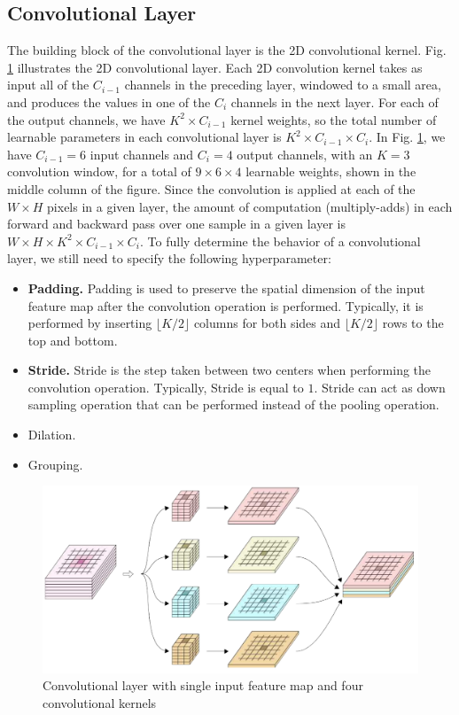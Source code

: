 \subsection{Convolutional Layer}
The building block of the convolutional layer is the 2D convolutional kernel. Fig. \ref{conv2Dlayer} illustrates the 2D convolutional layer. Each 2D convolution kernel takes as input all of the $C_{i-1}$ channels in the preceding layer, windowed to a small area, and produces the values in one of the $C_{i}$ channels in the next layer. For each of the output channels, we have $K^2\times C_{i-1}$ kernel weights, so the total number of learnable parameters in each convolutional layer is $K^2\times C_{i-1} \times C_{i}$. In Fig. \ref{conv2Dlayer}, we have $C_{i-1} = 6$ input channels and $C_{i} = 4$ output channels, with an $K = 3$ convolution window, for a total of $9 \times 6 \times 4$ learnable weights, shown in the middle column of the figure. Since the convolution is applied at each of the $W \times H$ pixels in a given layer, the amount of computation (multiply-adds) in each forward and backward pass
over one sample in a given layer is $W\times H \times K^{2} \times C_{i-1} \times C_{i}$.
To fully determine the behavior of a convolutional layer, we still need to specify the following hyperparameter:
\begin{itemize}
    \item \textbf{Padding.} Padding is used to preserve the spatial dimension of the input feature map after the convolution operation is performed. Typically, it is performed by inserting $\lfloor K/2 \rfloor$ columns for both sides and $\lfloor K/2 \rfloor$ rows to the top and bottom.
    \item \textbf{Stride.} Stride is the step taken between two centers when performing the convolution operation. Typically, Stride is equal to $1$. Stride can act as down sampling operation that can be performed instead of the pooling operation.
    \item Dilation.
    \item Grouping.
\end{itemize}





\begin{figure}
    \begin{center}
        \includegraphics[width=\textwidth]{Figures/2DConvKernels.png}
        \caption{Convolutional layer with single input feature map and four convolutional kernels}
        \label{conv2Dlayer}
    \end{center}
\end{figure}


